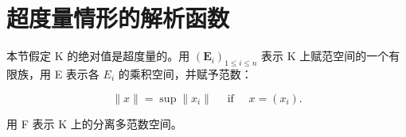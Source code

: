 \section{超度量情形的解析函数}

本节假定 K 的绝对值是超度量的。用 \((\mathbf{E}_{i})_{1\leqslant i\leqslant n}\) 表示 K 上赋范空间的一个有限族，用 E 表示各 \(E_{i}\) 的乘积空间，并赋予范数：

\[
\| x \| = \sup \| x _ {i} \| \quad \text { if } \quad x = (x _ {i}).
\]

用 F 表示 K 上的分离多范数空间。

